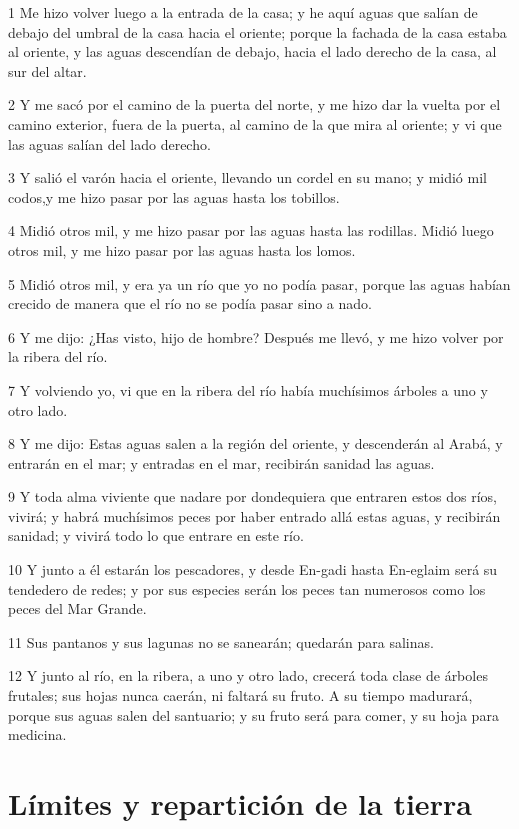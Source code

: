 \par 1 Me hizo volver luego a la entrada de la casa; y he aquí aguas que salían de debajo del umbral de la casa hacia el oriente; porque la fachada de la casa estaba al oriente, y las aguas descendían de debajo, hacia el lado derecho de la casa, al sur del altar.
\par 2 Y me sacó por el camino de la puerta del norte, y me hizo dar la vuelta por el camino exterior, fuera de la puerta, al camino de la que mira al oriente; y vi que las aguas salían del lado derecho.
\par 3 Y salió el varón hacia el oriente, llevando un cordel en su mano; y midió mil codos,y me hizo pasar por las aguas hasta los tobillos.
\par 4 Midió otros mil, y me hizo pasar por las aguas hasta las rodillas. Midió luego otros mil, y me hizo pasar por las aguas hasta los lomos.
\par 5 Midió otros mil, y era ya un río que yo no podía pasar, porque las aguas habían crecido de manera que el río no se podía pasar sino a nado.
\par 6 Y me dijo: ¿Has visto, hijo de hombre? Después me llevó, y me hizo volver por la ribera del río.
\par 7 Y volviendo yo, vi que en la ribera del río había muchísimos árboles a uno y otro lado.
\par 8 Y me dijo: Estas aguas salen a la región del oriente, y descenderán al Arabá, y entrarán en el mar; y entradas en el mar, recibirán sanidad las aguas.
\par 9 Y toda alma viviente que nadare por dondequiera que entraren estos dos ríos, vivirá; y habrá muchísimos peces por haber entrado allá estas aguas, y recibirán sanidad; y vivirá todo lo que entrare en este río.
\par 10 Y junto a él estarán los pescadores, y desde En-gadi hasta En-eglaim será su tendedero de redes; y por sus especies serán los peces tan numerosos como los peces del Mar Grande.
\par 11 Sus pantanos y sus lagunas no se sanearán; quedarán para salinas.
\par 12 Y junto al río, en la ribera, a uno y otro lado, crecerá toda clase de árboles frutales; sus hojas nunca caerán, ni faltará su fruto. A su tiempo madurará, porque sus aguas salen del santuario; y su fruto será para comer, y su hoja para medicina.

\section*{Límites y repartición de la tierra}

